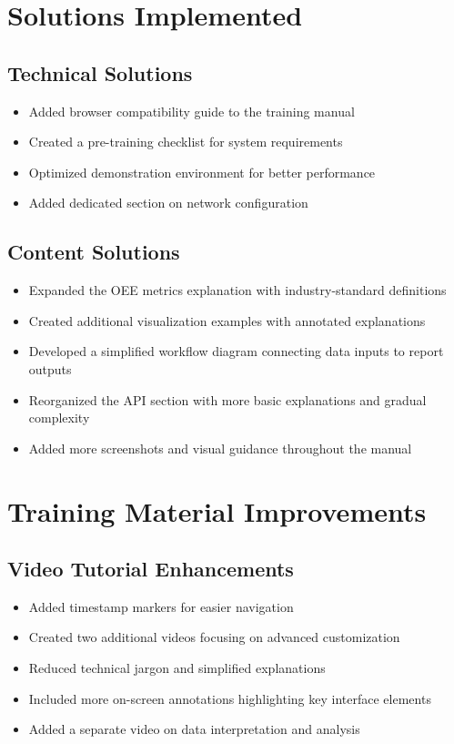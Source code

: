 \documentclass[12pt, letterpaper]{article}
\begin{document}
\section{Solutions Implemented}

\subsection{Technical Solutions}
\begin{itemize}
    \item Added browser compatibility guide to the training manual
    \item Created a pre-training checklist for system requirements
    \item Optimized demonstration environment for better performance
    \item Added dedicated section on network configuration
\end{itemize}

\subsection{Content Solutions}
\begin{itemize}
    \item Expanded the OEE metrics explanation with industry-standard definitions
    \item Created additional visualization examples with annotated explanations
    \item Developed a simplified workflow diagram connecting data inputs to report outputs
    \item Reorganized the API section with more basic explanations and gradual complexity
    \item Added more screenshots and visual guidance throughout the manual
\end{itemize}

\section{Training Material Improvements}

\subsection{Video Tutorial Enhancements}
\begin{itemize}
    \item Added timestamp markers for easier navigation
    \item Created two additional videos focusing on advanced customization
    \item Reduced technical jargon and simplified explanations
    \item Included more on-screen annotations highlighting key interface elements
    \item Added a separate video on data interpretation and analysis
\end{itemize}
\end{document}
